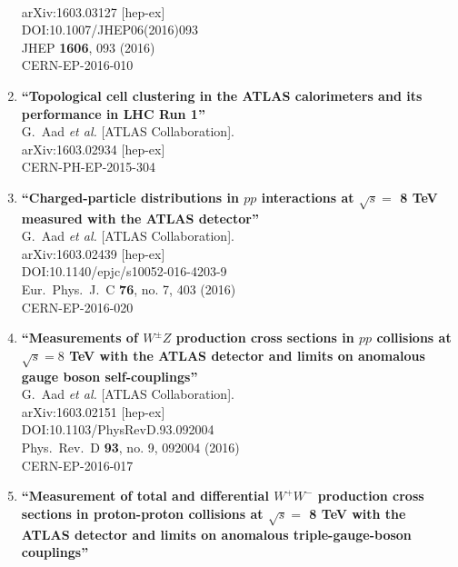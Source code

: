 \documentclass{article}
\begin{document}
\begin{enumerate}
  \\{}arXiv:1603.03127 [hep-ex]
  \\{}DOI:10.1007/JHEP06(2016)093
  \\{}JHEP {\bf 1606}, 093 (2016)
  \\{}CERN-EP-2016-010
\item%
{\bf ``Topological cell clustering in the ATLAS calorimeters and its performance in LHC Run 1''}
  \\{}G.~Aad {\it et al.} [ATLAS Collaboration].
  \\{}arXiv:1603.02934 [hep-ex]
  \\{}CERN-PH-EP-2015-304
\item%
{\bf ``Charged-particle distributions in $pp$ interactions at $\sqrt{s}=$ 8 TeV measured with the ATLAS detector''}
  \\{}G.~Aad {\it et al.} [ATLAS Collaboration].
  \\{}arXiv:1603.02439 [hep-ex]
  \\{}DOI:10.1140/epjc/s10052-016-4203-9
  \\{}Eur.\ Phys.\ J.\ C {\bf 76}, no. 7, 403 (2016)
  \\{}CERN-EP-2016-020
\item%
{\bf ``Measurements of $W^\pm Z$ production cross sections in $pp$ collisions at $\sqrt{s} = 8$ TeV with the ATLAS detector and limits on anomalous gauge boson self-couplings''}
  \\{}G.~Aad {\it et al.} [ATLAS Collaboration].
  \\{}arXiv:1603.02151 [hep-ex]
  \\{}DOI:10.1103/PhysRevD.93.092004
  \\{}Phys.\ Rev.\ D {\bf 93}, no. 9, 092004 (2016)
  \\{}CERN-EP-2016-017
\item%
{\bf ``Measurement of total and differential $W^+W^-$ production cross sections in proton-proton collisions at $\sqrt{s}=$ 8 TeV with the ATLAS detector and limits on anomalous triple-gauge-boson couplings''}

\end{enumerate}
\end{document}
